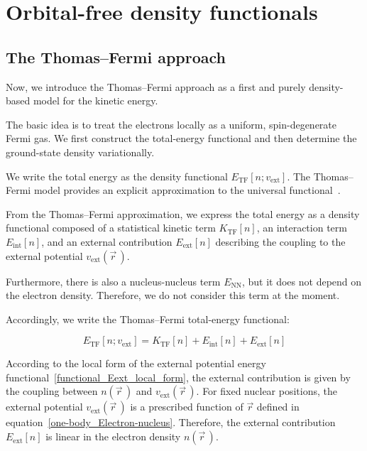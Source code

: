 \newpage
\FloatBarrier
\section{Orbital-free density functionals}
\label{sec:appendix_thomas_fermi}

\FloatBarrier
\subsection{The Thomas--Fermi approach}

Now, we introduce the Thomas--Fermi approach as a first and purely density-based model for the kinetic energy.

The basic idea is to treat the electrons locally as a uniform, spin-degenerate Fermi gas.
We first construct the total-energy functional and then determine the ground-state density variationally.

We write the total energy as the density functional $E_{\mathrm{TF}}[n;v_\mathrm{ext}]$.
The Thomas--Fermi model provides an explicit approximation to the universal functional~\cite{spruch1991pedagogic}.

From the Thomas--Fermi approximation, we express the total energy as a density functional composed of a statistical kinetic term $K_\mathrm{TF}[n]$, an interaction term $E_\mathrm{int}[n]$, and an external contribution $E_\mathrm{ext}[n]$ describing the coupling to the external potential $v_\mathrm{ext}(\vec{r}\,)$.

Furthermore, there is also a nucleus-nucleus term $E_\mathrm{NN}$, but it does not depend on the electron density. Therefore, we do not consider this term at the moment.

Accordingly, we write the Thomas--Fermi total-energy functional:

\begin{equation}
    E_{\mathrm{TF}}[n;v_\mathrm{ext}] = K_\mathrm{TF}[n] + E_\mathrm{int}[n] + E_\mathrm{ext}[n]
\label{TF_total_energy_functional}
\end{equation}

According to the local form of the external potential energy functional~\eqref{functional_Eext_local_form}, the external contribution is given by the coupling between $n(\vec{r}\,)$ and $v_\mathrm{ext}(\vec{r}\,)$.
For fixed nuclear positions, the external potential $v_\mathrm{ext}(\vec{r}\,)$ is a prescribed function of $\vec{r}$ defined in equation~\eqref{one-body_Electron-nucleus}. Therefore, the external contribution $E_\mathrm{ext}[n]$ is linear in the electron density $n(\vec{r}\,)$.

